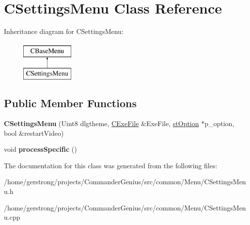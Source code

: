 \hypertarget{class_c_settings_menu}{
\section{CSettingsMenu Class Reference}
\label{class_c_settings_menu}
}
Inheritance diagram for CSettingsMenu:\begin{figure}[H]
\begin{center}
\leavevmode
\includegraphics[height=2cm]{class_c_settings_menu}
\end{center}
\end{figure}
\subsection*{Public Member Functions}
\begin{DoxyCompactItemize}
\item 
\hypertarget{class_c_settings_menu_a543ecf66799de1e6c6389a102b022a90}{
{\bfseries CSettingsMenu} (Uint8 dlgtheme, \hyperlink{class_c_exe_file}{CExeFile} \&ExeFile, \hyperlink{structst_option}{stOption} $\ast$p\_\-option, bool \&restartVideo)}
\label{class_c_settings_menu_a543ecf66799de1e6c6389a102b022a90}

\item 
\hypertarget{class_c_settings_menu_aef2a60bdb5682162c6754d3dc9e68af8}{
void {\bfseries processSpecific} ()}
\label{class_c_settings_menu_aef2a60bdb5682162c6754d3dc9e68af8}

\end{DoxyCompactItemize}


The documentation for this class was generated from the following files:\begin{DoxyCompactItemize}
\item 
/home/gerstrong/projects/CommanderGenius/src/common/Menu/CSettingsMenu.h\item 
/home/gerstrong/projects/CommanderGenius/src/common/Menu/CSettingsMenu.cpp\end{DoxyCompactItemize}

